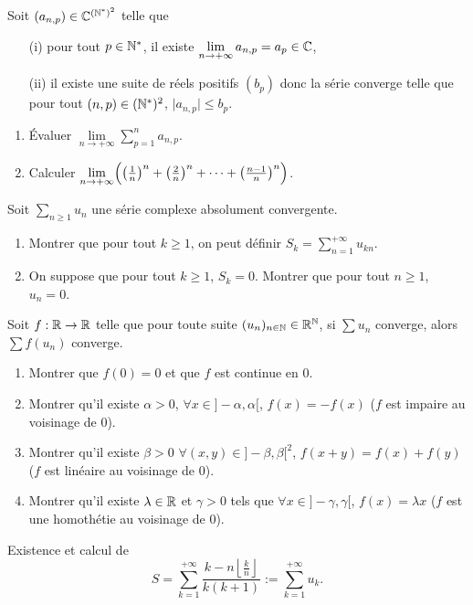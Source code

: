 \documentclass[12pt]{article}
\begin{document}
\begin{exercise}
	Soit $(a_{n,p})\in\mathbb{C}^{(\mathbb{N}^{*})^{2}}$ telle que 
	\begin{enumerate}
		\item
		[(i)] pour tout $p\in\mathbb{N}^{*}$, il existe
		$\lim\limits_{n\to+\infty}a_{n,p}=a_{p}\in\mathbb{C}$,
		\item
		[(ii)] il existe une suite de réels positifs $(b_{p})$ donc la série
		converge telle que pour tout $(n,p)\in(\mathbb{N}^{*})^{2}$, $\lvert
		a_{n,p}\rvert\leqslant b_{p}$.
		
	\end{enumerate}
	\begin{enumerate}
		\item
		Évaluer $\lim\limits_{n\to+\infty}\sum_{p=1}^{n}a_{n,p}$.
		\item
		Calculer
		$\lim\limits_{n\to+\infty}\Bigl(\bigl(\frac{1}{n}\bigr)^{n}+\bigl(\frac{2}{n}\bigr)^{n}+\dots+\bigl(\frac{n-1}{n}\bigr)^{n}\Bigr)$.
	\end{enumerate}
\end{exercise}

\begin{exercise}
	Soit $\sum_{n\geqslant1}u_{n}$ une série complexe absolument convergente.
	\begin{enumerate}
		\item
		Montrer que pour tout $k\geqslant1$, on peut définir
		$S_{k}=\sum_{n=1}^{+\infty}u_{kn}$.
		\item
		On suppose que pour tout $k\geqslant1$, $S_{k}=0$. Montrer que pour tout
		$n\geqslant1$, $u_{n}=0$.
	\end{enumerate}
\end{exercise}

\begin{exercise}
	Soit $f:\mathbb{R}\to\mathbb{R}$ telle que pour toute suite $(u_{n})_{n\in\mathbb{N}}\in\mathbb{R}^{\mathbb{N}}$, si
$\sum u_{n}$ converge, alors $\sum f(u_{n})$ converge.
\begin{enumerate}
	\item
	Montrer que $f(0)=0$ et que $f$ est continue en 0.
	\item
	Montrer qu'il existe $\alpha>0$, $\forall x\in]-\alpha,\alpha[$, $f(x)=-f(x)$
	($f$ est impaire au voisinage de 0).
	\item
	Montrer qu'il existe $\beta>0$ $\forall(x,y)\in]-\beta,\beta[^{2}$,
	$f(x+y)=f(x)+f(y)$ ($f$ est linéaire au voisinage de 0).
	\item
	Montrer qu'il existe $\lambda\in\mathbb{R}$ et $\gamma>0$ tels que $\forall
	x\in]-\gamma,\gamma[$, $f(x)=\lambda x$ ($f$ est une homothétie au voisinage
	de 0).
\end{enumerate}
\end{exercise}

\begin{exercise}
	Existence et calcul de 
	\begin{equation*}
		S=\sum_{k=1}^{+\infty}\frac{k-n\left\lfloor\frac{k}{n}\right\rfloor}{k(k+1)}:=\sum_{k=1}^{+\infty}u_k.
	\end{equation*}
\end{exercise}
\end{document}
